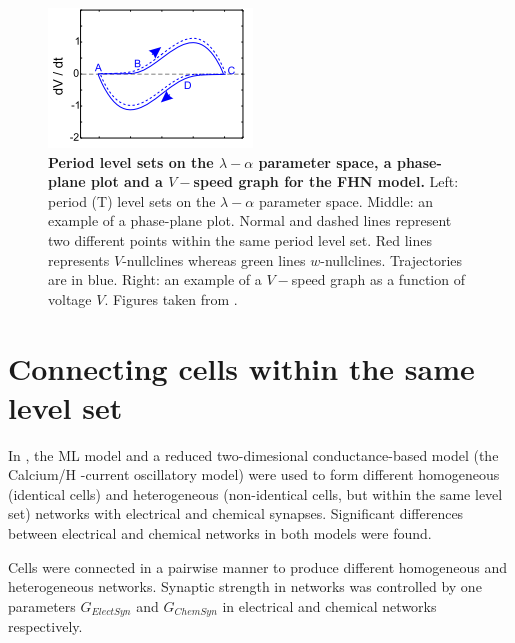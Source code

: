 \begin{figure}[h]
\begin{minipage}{0.29\linewidth}
\begin{center}
            \includegraphics[width=1\linewidth]{Images/photo5_3.png}
        \end{center}
    \end{minipage} 
  
  \caption{\textbf{Period level sets on the $\lambda-\alpha$ parameter space, a phase-plane plot and a $V-$speed graph for the FHN model.} Left: period (T) level sets on the $\lambda-\alpha$ parameter space. Middle: an example of a phase-plane plot. Normal and dashed lines represent two different points within the same period level set. Red lines represents $V$-nullclines whereas green lines $w$-nullclines. Trajectories are in blue. Right: an example of a $V-$speed graph as a function of voltage $V$. Figures taken from \cite{Rot}.}
  \label{photo5}
\end{figure}

\section{Connecting cells within the same level set}
In \cite{Iii2019}, the ML model and a reduced two-dimesional conductance-based model (the Calcium/H -current oscillatory model) were used to form different homogeneous (identical cells) and heterogeneous (non-identical cells, but within the same level set) networks with electrical and chemical synapses. Significant differences between electrical and chemical networks in both models were found.

Cells were connected in a pairwise manner to produce different homogeneous and heterogeneous networks. Synaptic strength in networks was controlled by one parameters $G_{ElectSyn}$ and $G_{ChemSyn}$ in electrical and chemical networks respectively.


